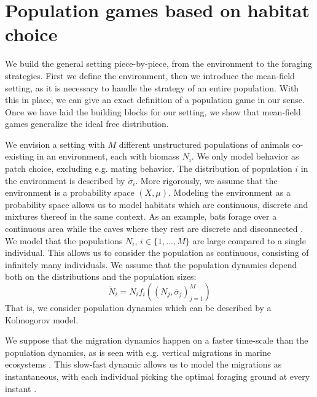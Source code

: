 \section{Population games based on habitat choice}
\label{sec:general_setting}
We build the general setting piece-by-piece, from the environment to the foraging strategies. First we define the environment, then we introduce the mean-field setting, as it is necessary to handle the strategy of an entire population. With this in place, we can give an exact definition of a population game in our sense. Once we have laid the building blocks for our setting, we show that mean-field games generalize the ideal free distribution.


We envision a setting with $M$ different unstructured populations of animals co-existing in an environment, each with biomass $N_i$. We only model behavior as patch choice, excluding e.g. mating behavior. The distribution of population $i$ in the environment is described by $\overbar{\sigma}_i$.  More rigorously, we assume that the environment is a probability space $(X,\mu)$. Modeling the environment as a probability space allows us to model habitats which are continuous, discrete and mixtures thereof in the same context. As an example, bats forage over a continuous area while the caves where they rest are discrete and disconnected \citep{collet2019algorithmic}. We model that the populations $N_i$, $i\in \{1,\dots,M\}$  are large compared to a single individual. This allows us to consider the population as continuous, consisting of infinitely many individuals. We assume that the population dynamics depend both on the distributions and the population sizes:
\begin{equation}
  \label{eq:vk_dyn}
  \dot{N}_i = N_i f_i((N_j,\overbar{\sigma}_j)_{j=1}^M)
\end{equation}
That is, we consider population dynamics which can be described by a Kolmogorov model.

We suppose that the migration dynamics happen on a faster time-scale than the population dynamics, as is seen with e.g. vertical migrations in marine ecosystems \citep{iwasa1982vertical}. This slow-fast dynamic allows us to model the migrations as instantaneous, with each individual picking the optimal foraging ground at every instant \citep{kvrivan2013behavioral, cressman2006migration}.


